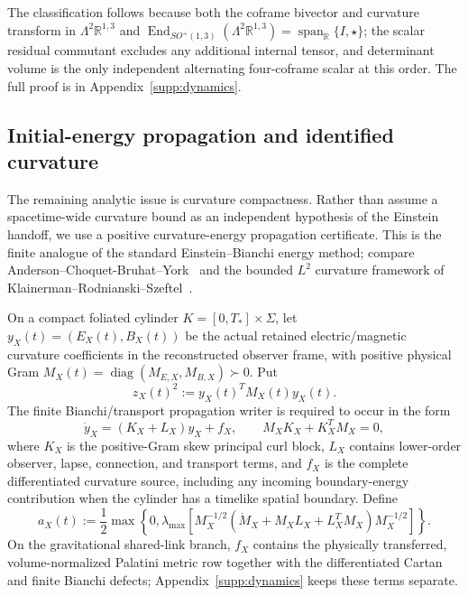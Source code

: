 \documentclass[11pt]{article}
\theoremstyle{definition}
\theoremstyle{remark}
\newcommand{\R}{\mathbb R}
\newcommand{\Span}{\operatorname{span}}
\begin{document}
The classification follows because both the coframe bivector and curvature
transform in $\Lambda^2\R^{1,3}$ and
$\operatorname{End}_{SO^+(1,3)}(\Lambda^2\R^{1,3})
=\Span_{\R}\{I,\star\}$; the scalar residual commutant excludes any additional
internal tensor, and determinant volume is the only independent alternating
four-coframe scalar at this order.  The full proof is in
Appendix~\ref{supp:dynamics}.

\subsection{Initial-energy propagation and identified curvature}

The remaining analytic issue is curvature compactness.  Rather than assume a
spacetime-wide curvature bound as an independent hypothesis of the Einstein
handoff, we use a positive curvature-energy propagation certificate.  This is
the finite analogue of the standard Einstein--Bianchi energy method; compare
Anderson--Choquet-Bruhat--York~\cite{ACY1998} and the bounded $L^2$ curvature
framework of Klainerman--Rodnianski--Szeftel~\cite{KRS2015}.

On a compact foliated cylinder $K=[0,T_*]\times\Sigma$, let
$y_X(t)=(E_X(t),B_X(t))$ be the actual retained electric/magnetic curvature
coefficients in the reconstructed observer frame, with positive physical Gram
$M_X(t)=\operatorname{diag}(M_{E,X},M_{B,X})\succ0$.  Put
\begin{equation}
 z_X(t)^2:=y_X(t)^TM_X(t)y_X(t).
 \label{eq:main-curvature-energy}
\end{equation}
The finite Bianchi/transport propagation writer is required to occur in the
form
\begin{equation}
 \dot y_X=(K_X+L_X)y_X+f_X,
 \qquad M_XK_X+K_X^TM_X=0,
 \label{eq:main-curvature-propagation-writer}
\end{equation}
where $K_X$ is the positive-Gram skew principal curl block, $L_X$ contains
lower-order observer, lapse, connection, and transport terms, and $f_X$ is the
complete differentiated curvature source, including any incoming boundary-energy
contribution when the cylinder has a timelike spatial boundary.  Define
\begin{equation}
 a_X(t):=\frac12\max\left\{0,
 \lambda_{\max}\!\left[
 M_X^{-1/2}(\dot M_X+M_XL_X+L_X^TM_X)M_X^{-1/2}
 \right]\right\}.
 \label{eq:main-curvature-growth}
\end{equation}
On the gravitational shared-link branch, $f_X$ contains the physically
transferred, volume-normalized Palatini metric row together with the
differentiated Cartan and finite Bianchi defects; Appendix~\ref{supp:dynamics}
keeps these terms separate.
\end{document}
